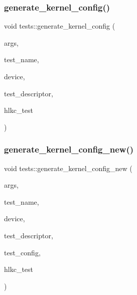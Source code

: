 \mbox{\label{namespacetests_a7cec560b495f08abb3831babd2775513}} 
\subsubsection{\texorpdfstring{generate\+\_\+kernel\+\_\+config()}{generate\_kernel\_config()}}
{\footnotesize\ttfamily void tests\+::generate\+\_\+kernel\+\_\+config (\begin{DoxyParamCaption}\item[{\hyperlink{structtests_1_1TestArgs}{tests\+::\+Test\+Args} \&}]{args,  }\item[{std\+::string}]{test\+\_\+name,  }\item[{\hyperlink{classllk_1_1Device}{llk\+::\+Device} \&}]{device,  }\item[{Y\+A\+M\+L\+::\+Node \&}]{test\+\_\+descriptor,  }\item[{bool}]{hlkc\+\_\+test }\end{DoxyParamCaption})}

\mbox{\label{namespacetests_a36b83a1268e91407bb328fc40deb29d8}} 
\subsubsection{\texorpdfstring{generate\+\_\+kernel\+\_\+config\+\_\+new()}{generate\_kernel\_config\_new()}}
{\footnotesize\ttfamily void tests\+::generate\+\_\+kernel\+\_\+config\+\_\+new (\begin{DoxyParamCaption}\item[{\hyperlink{structtests_1_1TestArgs}{tests\+::\+Test\+Args} \&}]{args,  }\item[{std\+::string}]{test\+\_\+name,  }\item[{\hyperlink{classllk_1_1Device}{llk\+::\+Device} \&}]{device,  }\item[{Y\+A\+M\+L\+::\+Node \&}]{test\+\_\+descriptor,  }\item[{\hyperlink{structtests_1_1TestConfig}{tests\+::\+Test\+Config} \&}]{test\+\_\+config,  }\item[{bool}]{hlkc\+\_\+test }\end{DoxyParamCaption})}



